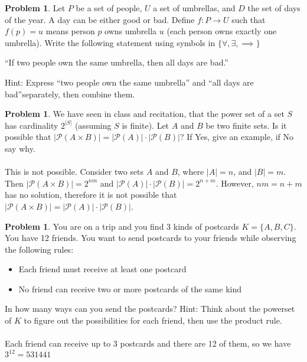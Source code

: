 \documentclass[10pt,leqno ]{article}
\theoremstyle{definition}
\newtheorem{problem}[theorem]{Problem}
\begin{document}
\begin{problem} Let $P$ be a set of people, $U$ a set of umbrellas, and $D$ the set of days of the year.  A day can be either good or bad.  Define $f:P \to U$ such that $f(p) =u$ means person $p$ owns umbrella $u$ (each person owns exactly one umbrella).  Write the following statement using symbols in $\{\forall,\exists,\implies\}$
\begin{center}
“If two people own the same umbrella, then all days are bad.”
\end{center}
Hint: Express “two people own the same umbrella” and “all days are bad”separately, then combine them.
\Large
\end{problem}
\newpage

\begin{problem} We have seen in class and recitation, that the power set of a set $S$ has cardinality $2^{|S|}$ (assuming $S$ is finite).  Let $A$ and $B$ be two finite sets.  Is it possible that $|\mathcal{P}(A \times B)|=|\mathcal{P}(A)|\cdot|\mathcal{P}(B)|$?  If Yes, give an example, if No say why.
\\\\
\Large
This is not possible.  Consider two sets $A$ and $B$, where $|A| = n$, and $|B| = m$.  Then $|\mathcal{P}(A \times B)| = 2^{nm}$ and $|\mathcal{P}(A)| \cdot |\mathcal{P}(B)| = 2^{n+m}$.  However, $nm = n+m$ has no solution, therefore it is not possible that $|\mathcal{P}(A \times B)|=|\mathcal{P}(A)|\cdot|\mathcal{P}(B)|$.
\end{problem}
\newpage

\begin{problem} You are on a trip and you find 3 kinds of postcards $K=\{A, B, C\}$.  You have 12 friends.  You want to send postcards to your friends while observing the following rules:
\begin{itemize}
\item Each friend must receive at least one postcard\\
\item No friend can receive two or more postcards of the same kind
\end{itemize}
In how many ways can you send the postcards?  Hint:  Think about the powerset of $K$ to figure out the possibilities for each friend, then use the product rule.
\Large
\\\\
Each friend can receive up to 3 postcards and there are 12 of them, so we have $3^{12} = 531441$
\end{problem}
\newpage
\end{document}
